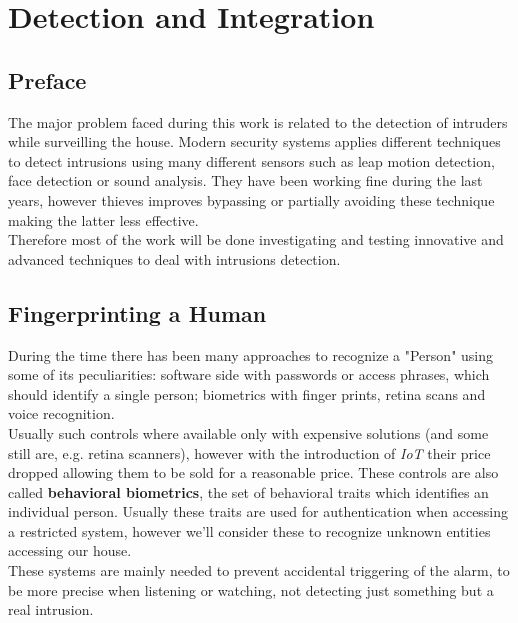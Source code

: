 \chapter{Detection and Integration}


\section{Preface}
The major problem faced during this work is related
to the detection of intruders while surveilling the house.
Modern security systems applies different techniques to detect intrusions
using many different sensors such as leap motion detection, face detection
or sound analysis. They have been working fine during the last years, however
thieves improves bypassing or partially avoiding these technique making the latter
less effective.\\
Therefore most of the work will be done investigating and testing innovative and
advanced techniques to deal with intrusions detection.

\section{Fingerprinting a Human}

During the time there has been many approaches to recognize a "Person"
using some of its peculiarities: software side with passwords or access phrases,
which should identify a single person; biometrics with finger prints, retina scans
and voice recognition.\\
Usually such controls where available only with expensive solutions (and some still are, e.g. retina
scanners), however with the introduction of \textit{IoT} their price dropped allowing
them to be sold for a reasonable price. These controls are also called \textbf{behavioral biometrics},
the set of behavioral traits which identifies an individual person. Usually these traits are
used for authentication when accessing a restricted system, however we'll consider
these to recognize unknown entities accessing our house. \\
These systems are mainly needed to prevent accidental triggering of the alarm, to be more
precise when listening or watching, not detecting just something but a real intrusion.

